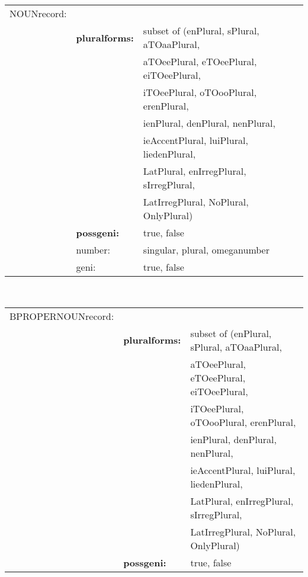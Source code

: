 \begin{tabular}{lll}
NOUNrecord:  &                 &              \\
             & {\bf pluralforms:} & subset of (enPlural, sPlural, aTOaaPlural,  \\
             &                 & aTOeePlural, eTOeePlural, eiTOeePlural,    \\
             &                 & iTOeePlural, oTOooPlural, erenPlural,      \\
             &                 & ienPlural, denPlural, nenPlural,           \\
             &                 & ieAccentPlural, luiPlural, liedenPlural,   \\
             &                 & LatPlural, enIrregPlural, sIrregPlural,    \\
             &                 & LatIrregPlural, NoPlural, OnlyPlural)      \\
             & {\bf possgeni:} & true, false                          \\
             & number:               & singular, plural, omeganumber        \\
             & geni:                 & true, false                          \\
\end{tabular}
\\
\begin{tabular}{lll}
BPROPERNOUNrecord: &           &              \\
             & {\bf pluralforms:} & subset of (enPlural, sPlural, aTOaaPlural,  \\
             &                 & aTOeePlural, eTOeePlural, eiTOeePlural,    \\
             &                 & iTOeePlural, oTOooPlural, erenPlural,      \\
             &                 & ienPlural, denPlural, nenPlural,           \\
             &                 & ieAccentPlural, luiPlural, liedenPlural,   \\
             &                 & LatPlural, enIrregPlural, sIrregPlural,    \\
             &                 & LatIrregPlural, NoPlural, OnlyPlural)      \\
             & {\bf possgeni:} & true, false                          \\
\end{tabular}
\\
